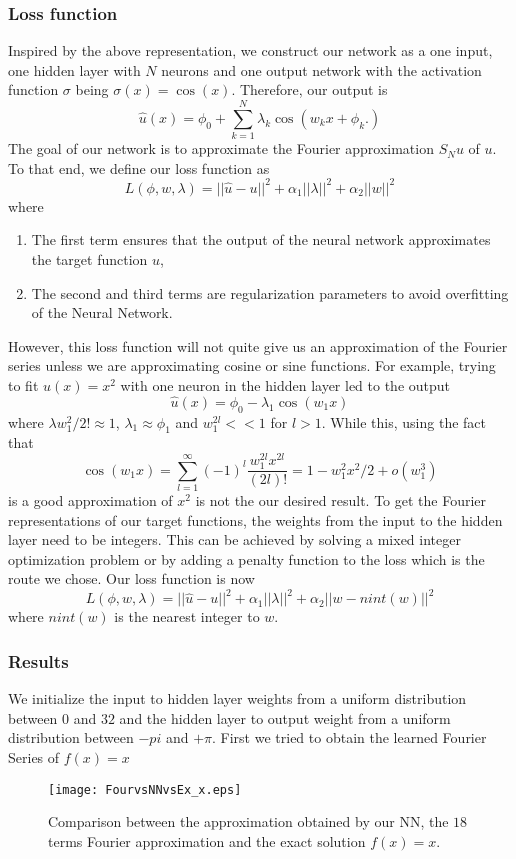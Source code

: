 \documentclass[11pt]{article}
\begin{document}
\subsubsection{Loss function}
Inspired by the above representation, we construct our network as a one input, one hidden layer with $N$ neurons and one output network with the activation function $\sigma$ being $\sigma(x) = \cos(x)$. Therefore, our output is 
$$ \hat{u}(x) = \phi_0 + \sum_{k = 1}^N \lambda_k \cos\left( w_{k}x + \phi_k. \right)$$
 The goal of our network is to approximate the Fourier approximation $S_N u$ of $u$. To that end, we define our loss function as
 \begin{equation}\label{lossfunction}
     L(\phi, w, \lambda) = ||\hat{u} - u ||^2  + \alpha_1||\lambda||^2 + \alpha_2||w||^2
 \end{equation}
 where
 \begin{enumerate}
     \item The first term ensures that the output of the neural network approximates the target function $u$,
     \item The second and third terms are regularization parameters to avoid overfitting of the Neural Network.
 \end{enumerate}
 
 However, this loss function will not quite give us an approximation of the Fourier series unless we are approximating cosine or sine functions. For example, trying to fit $u(x) = x^2$ with one neuron in the hidden layer led to the output 
 $$\hat{u}(x) = \phi_0 - \lambda_1 \cos(w_1 x)$$ where  $\lambda w_1^2 /2! \approx 1$, $\lambda_1 \approx \phi_1$ and $w_1^{2l} << 1$ for $l >1$. While this, using the fact that
 $$
 \cos(w_1 x) = \sum_{l=1}^{\infty} (-1)^l\frac{w_1^{2l}x^{2l}}{(2l)!} = 1 -w_1^2x^2/2 + o(w_1^3)
 $$
 is a good approximation of $x^2$ is not the our desired result. To get the Fourier representations of our target functions, the weights from the input to the hidden layer need to be integers. This can be achieved by solving a mixed integer optimization problem or by adding a penalty function to the loss which is the route we chose. Our loss function is now
  \begin{equation}\label{lossfunction_good}
     L(\phi, w, \lambda) = ||\hat{u} - u ||^2  + \alpha_1||\lambda||^2 + \alpha_2||w-nint(w)||^2
 \end{equation}
 where $nint(w)$ is the nearest integer to $w$.
\subsubsection{Results}
 We initialize the input to hidden layer weights from a uniform distribution between $0$ and $32$ and the hidden layer to output weight from a uniform distribution between $-pi$ and $+\pi$. First we tried to obtain the learned Fourier Series of $f(x) = x$
 \begin{figure}[!htb]
    \centering
    \texttt{[image: FourvsNNvsEx\_x.eps]}
    \caption{Comparison between the approximation obtained by our NN, the $18$ terms Fourier approximation and the exact solution $f(x) = x$.}
    \label{fig:fourvsNN_x}
\end{figure}
 
\end{document}
